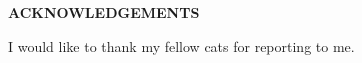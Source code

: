 {}
\begin{center}
    \large{\bf ACKNOWLEDGEMENTS}
\end{center}

I would like to thank my fellow cats for reporting to me.
